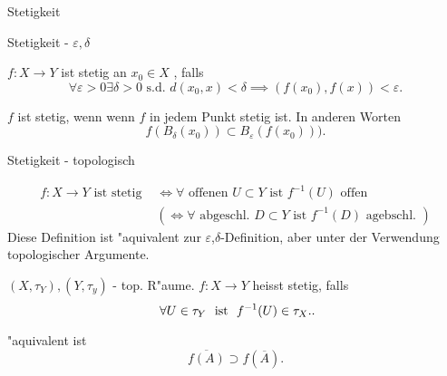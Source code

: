 \documentclass[class=article, crop=false]{standalone}
\begin{document}
\begin{zettel}{Stetigkeit}
\begin{flashcard}

	\begin{question}
		Stetigkeit - $\varepsilon, \delta $
	\end{question}

	\begin{definition}[Stetigkeit]
		$f:X \longrightarrow Y$ ist stetig an $x_0 \in  X$ , falls
		\[
			\forall \varepsilon >  0 \exists  \delta  > 0 \text{ s.d. }  d (x_0 , x) < \delta \implies (f (x_0), f (x)) <  \varepsilon
		.\]

		$f$ ist stetig, wenn wenn $f$ in jedem Punkt stetig ist.
		In anderen Worten
		\[
			f (B_{\delta }(x_0)) \subset B_{\varepsilon } (f (x_0)) ).
		\]
	\end{definition}
\end{flashcard}

\begin{flashcard}
	\begin{question}
		Stetigkeit - topologisch
	\end{question}
	\begin{definition}[Stetigkeit]
		\begin{align*}
			f:X \longrightarrow Y \text{ ist stetig } & \iff \forall \text{ offenen } U \subset Y \text{ ist } f^{-1} (U) \text{ offen }            \\
			                                          & ( \iff \forall  \text{ abgeschl. } D \subset Y \text{ ist } f^{-1} (D) \text{ agebschl. } )
		\end{align*}
		Diese Definition ist "aquivalent zur $\varepsilon $,$\delta$-Definition, aber unter der Verwendung topologischer Argumente.
	\end{definition}
\end{flashcard}

\begin{definition}[Stetigkeit]
	$(X, \tau_Y), (Y, \tau_y)$  - top. R"aume. $f:X \longrightarrow Y$ heisst stetig, falls
	\[
		\forall U \in  \tau_Y \tx{ ist } f^{-1} (U) \in  \tau_X.
	.\]
\end{definition}

"aquivalent ist
\[
	\overline{f(A)} \supset f (\overline{A})
.\]

\end{zettel}
\end{document}
